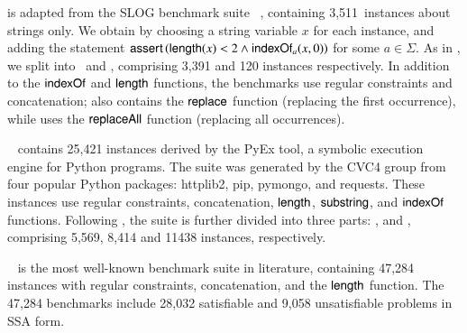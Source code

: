 \smallskip
\noindent{\slogbench} is adapted from the SLOG benchmark suite%
~\cite{fang-yu-circuits}, containing 3,511~instances about strings only.
We  obtain  {\slogbench}  by choosing a string variable $x$ for each instance,
and adding the statement $\textsf{assert}\left(\mathsf{length}(x) < 2 \wedge \mathsf{indexOf}_{a}(x, 0)\right)$ for some $a \in \Sigma$.
As in \cite{CHL+19}, we  split  {\slogbench}  into  \slogbenchr\ and \slogbenchra,  comprising 3,391 and 120 instances respectively. In addition to %
the $\mathsf{indexOf}$ and $\mathsf{length}$ functions, the benchmarks use regular constraints and concatenation;  {\slogbenchr} also contains the $\mathsf{replace}$ function (replacing the first occurrence), while {\slogbenchra}  uses the $\mathsf{replaceAll}$ function (replacing all occurrences).


\smallskip
\noindent \pyexbench~\cite{ReynoldsWBBLT17} 
contains 25,421 instances  derived by the PyEx tool, a symbolic execution engine for Python programs. The {\pyexbench} suite was generated by the CVC4 group from four popular Python packages: httplib2, pip, pymongo, and requests. These instances use regular constraints, concatenation, $\mathsf{length}$, $\mathsf{substring}$, and $\mathsf{indexOf}$ functions. Following \cite{ReynoldsWBBLT17}, the {\pyexbench} suite is further divided into three parts: {\pyextdbench},  {\pyexztbench} and {\pyexzzbench}, comprising 5,569, 8,414 and 11438  instances, respectively. 

\smallskip
\noindent\kaluzabench~\cite{Berkeley-JavaScript}
%
is the most well-known  benchmark suite in  literature, 
containing 47,284 instances with regular constraints, concatenation, and the $\mathsf{length}$ function. The 47,284 benchmarks include 28,032 satisfiable and 9,058 unsatisfiable problems in SSA form.


